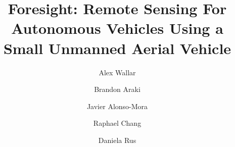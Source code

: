 \documentclass[graybox]{svmult}
\begin{document}
\title*{Foresight: Remote Sensing For Autonomous Vehicles Using a Small
Unmanned Aerial Vehicle}


\author{Alex Wallar \and Brandon Araki \and Javier Alonso-Mora \and Raphael Chang
\and Daniela Rus}


\maketitle

















\end{document}
